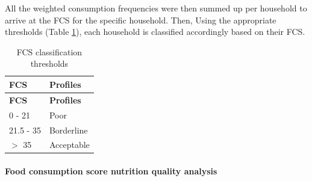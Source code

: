 \documentclass[12pt,a4paper]{article}
\let\oldparagraph\paragraph
\renewcommand{\paragraph}[1]{\oldparagraph{#1}\mbox{}}
\begin{document}
All the weighted consumption frequencies were then summed up per household to arrive at the FCS for the specific household. Then, Using the appropriate thresholds (Table \ref{tab:fcsThresholds}), each household is classified accordingly based on their FCS.

\begin{longtable}[]{@{}ll@{}}
\caption{\label{tab:fcsThresholds} FCS classification thresholds}\tabularnewline
\toprule
\begin{minipage}[b]{0.16\columnwidth}\raggedright
\textbf{FCS}\strut
\end{minipage} & \begin{minipage}[b]{0.20\columnwidth}\raggedright
\textbf{Profiles}\strut
\end{minipage}\tabularnewline
\midrule
\endfirsthead
\toprule
\begin{minipage}[b]{0.16\columnwidth}\raggedright
\textbf{FCS}\strut
\end{minipage} & \begin{minipage}[b]{0.20\columnwidth}\raggedright
\textbf{Profiles}\strut
\end{minipage}\tabularnewline
\midrule
\endhead
\begin{minipage}[t]{0.16\columnwidth}\raggedright
0 - 21\strut
\end{minipage} & \begin{minipage}[t]{0.20\columnwidth}\raggedright
Poor\strut
\end{minipage}\tabularnewline
\begin{minipage}[t]{0.16\columnwidth}\raggedright
21.5 - 35\strut
\end{minipage} & \begin{minipage}[t]{0.20\columnwidth}\raggedright
Borderline\strut
\end{minipage}\tabularnewline
\begin{minipage}[t]{0.16\columnwidth}\raggedright
\(>\) 35\strut
\end{minipage} & \begin{minipage}[t]{0.20\columnwidth}\raggedright
Acceptable\strut
\end{minipage}\tabularnewline
\bottomrule
\end{longtable}

\hypertarget{fcsn}{%
\paragraph{Food consumption score nutrition quality analysis}\label{fcsn}}
\end{document}
